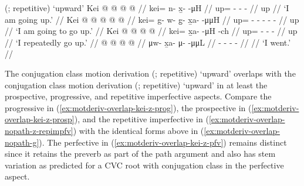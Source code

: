 \documentclass[12pt,letterpaper,oneside,article]{memoir}
\begin{document}
\pex\label{ex:motderiv-overlap-nopath-g}%
\a\label{ex:motderiv-overlap-nopath-g-motderiv}%
%
	 (;  repetitive) ‘upward’
\a\label{ex:motderiv-overlap-nopath-g-prog}%
%
\begingl
	\gla	Kei @  @ {} @ {} @ {} //
	\glb	kei= n- x̱-  -μH //
	\glc	up= - -  - //
	\gld	up\•  {} {} {} //
	\glft	‘I am going up.’
		//
\endgl
\a\label{ex:motderiv-overlap-nopath-g-prosp}%
%
\begingl
	\gla	Kei  @ {} @ {} @ {} @ {} @ {} //
	\glb	kei= g- w- g̱- x̱a-  -μμH //
	\glc	up= - - - -  - //
	\gld	up\•  {} {} {} {} {} //
	\glft	‘I am going to go up.’
		//
\endgl
\a\label{ex:motderiv-overlap-nopath-g-repimpfv}%
%
\begingl
	\gla	Kei @  @ {} @ {} @ {} //
	\glb	kei= x̱a-  -μH -ch //
	\glc	up= -  - - //
	\gld	up\•  {} {} {} //
	\glft	‘I repeatedly go up.’
		//
\endgl
\a\label{ex:motderiv-overlap-nopath-g-pfv}%
%
\begingl
	\gla	{} @ {} @ {} @ {} @ {} //
	\glb	μw- x̱a- μ-  -μμL //
	\glc	{}- - -  - //
	\gld	{} {} {} {} {} //
	\glft	‘I went.’
		//
\endgl
\xe


The  conjugation class motion derivation  (;  repetitive) ‘upward’ overlaps with the  conjugation class motion derivation  (;  repetitive) ‘upward’ in at least the prospective, progressive, and repetitive imperfective aspects.
Compare the progressive in (\ref{ex:motderiv-overlap-kei-z-prog}), the prospective in (\ref{ex:motderiv-overlap-kei-z-prosp}), and the repetitive imperfective in (\ref{ex:motderiv-overlap-nopath-z-repimpfv}) with the identical forms above in (\ref{ex:motderiv-overlap-nopath-g}).
The perfective in (\ref{ex:motderiv-overlap-kei-z-pfv}) remains distinct since it retains the  preverb as part of the path argument and also has  stem variation as predicted for a CVC root with  conjugation class in the perfective aspect.
\end{document}
